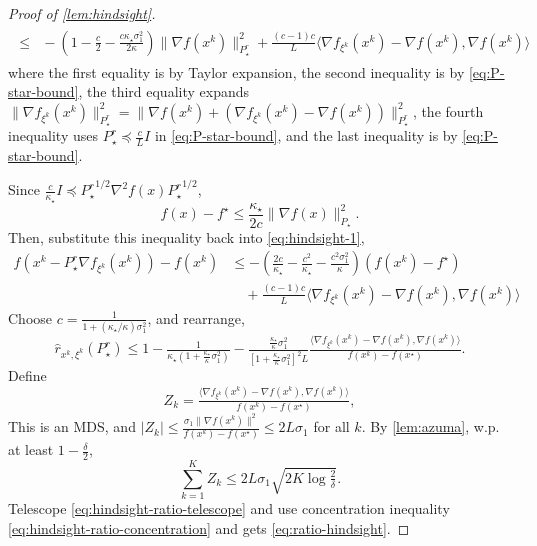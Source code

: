 \documentclass[10pt,a4paper]{amsart}
\begin{document}
\begin{proof}[Proof of \cref{lem:hindsight}]
\begin{align}
\begin{split}
    \leq &{} - \left( 1 - \tfrac{c}{2} - \tfrac{c \kappa_{\star}
    \sigma_1^2}{2 \kappa} \right) \| \nabla f (x^k) \|_{P^r_{\star}}^2 +
    \tfrac{(c - 1) c}{L} \langle \nabla f_{\xi^k} (x^k) - \nabla f (x^k),
    \nabla f (x^k) \rangle 
    \end{split}
  \end{align}
  where the first equality is by Taylor expansion, the second inequality is by
  \eqref{eq:P-star-bound}, the third equality expands $\| \nabla f_{\xi^k}
  (x^k) \|_{P^r_{\star}}^2 = \| \nabla f (x^k) + (\nabla f_{\xi^k} (x^k) -
  \nabla f (x^k)) \|_{P^r_{\star}}^2$, the fourth inequality uses $P^r_{\star}
  \preceq \tfrac{c}{L} I$ in \eqref{eq:P-star-bound}, and the
  last inequality is by \eqref{eq:P-star-bound}.
  
  Since $\frac{c}{\kappa_{\star}} {I \preceq P^r_{\star}}^{1 / 2} \nabla^2 f
  (x) {P^r_{\star}}^{1 / 2}$,
  \[ f (x) - f^{\star} \leq \frac{\kappa_{\star}}{2 c} \| \nabla f (x)
     \|_{P_{\star}}^2 . \]
  Then, substitute this inequality back into \eqref{eq:hindsight-1},
  \begin{align*}
    f (x^k - P^r_{\star} \nabla f_{\xi^k} (x^k)) - f (x^k) &{}\leq - \left(
    \tfrac{2 c}{\kappa_{\star}} - \tfrac{c^2}{\kappa_{\star}} - \tfrac{c^2
    \sigma_1^2}{\kappa} \right) (f (x^k) - f^{\star})\\
    &{}\quad + \tfrac{(c - 1) c}{L} \langle \nabla f_{\xi^k} (x^k) - \nabla f
    (x^k), \nabla f (x^k) \rangle
  \end{align*}
  Choose $c = \frac{1}{1 + (\kappa_{\star} / \kappa) \sigma_1^2}$, and
  rearrange,
  \begin{equation}
    \hat{r}_{x^k, \xi^k} (P^r_{\star}) \leq 1 - \tfrac{1}{\kappa_{\star}
    \left( 1 + \frac{\kappa_{\star}}{\kappa} \sigma_1^2 \right)} -
    \tfrac{\frac{\kappa_{\star}}{\kappa} \sigma_1^2}{\left[ 1 +
    \frac{\kappa_{\star}}{\kappa} \sigma_1^2 \right]^2 L} \tfrac{\langle
    \nabla f_{\xi^k} (x^k) - \nabla f (x^k), \nabla f (x^k) \rangle}{f (x^k) -
    f (x^{\star})} . \label{eq:hindsight-ratio-telescope}
  \end{equation}
  Define
  \[ Z_k = \tfrac{\langle \nabla f_{\xi^k} (x^k) - \nabla f (x^k), \nabla f
     (x^k) \rangle}{f (x^k) - f (x^{\star})}, \]
  This is an MDS, and $| Z_k | \leq \tfrac{\sigma_1 \| \nabla f (x^k) \|^2}{f
  (x^k) - f (x^{\star})} \leq 2 L \sigma_1$ for all $k$. By
  \cref{lem:azuma}, w.p. at least $1 - \frac{\delta}{2}$,
  \begin{equation}
    \textstyle \sum_{k = 1}^K Z_k \leq 2 L \sigma_1 \sqrt{2 K \log \tfrac{2}{\delta}} .
    \label{eq:hindsight-ratio-concentration}
  \end{equation}
  Telescope \eqref{eq:hindsight-ratio-telescope} and use concentration
  inequality \eqref{eq:hindsight-ratio-concentration} and gets
  \eqref{eq:ratio-hindsight}.
  

\end{proof}
\end{document}
